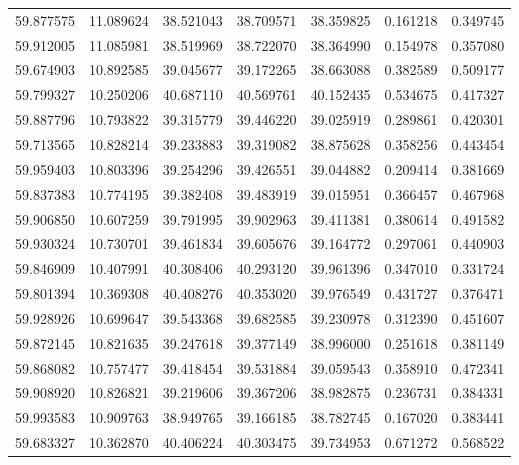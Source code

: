 \begin{tabular}{rrrrrrr}
 59.877575 &  11.089624 &         38.521043 &         38.709571 &         38.359825 &  0.161218 &  0.349745 \\
 59.912005 &  11.085981 &         38.519969 &         38.722070 &         38.364990 &  0.154978 &  0.357080 \\
 59.674903 &  10.892585 &         39.045677 &         39.172265 &         38.663088 &  0.382589 &  0.509177 \\
 59.799327 &  10.250206 &         40.687110 &         40.569761 &         40.152435 &  0.534675 &  0.417327 \\
 59.887796 &  10.793822 &         39.315779 &         39.446220 &         39.025919 &  0.289861 &  0.420301 \\
 59.713565 &  10.828214 &         39.233883 &         39.319082 &         38.875628 &  0.358256 &  0.443454 \\
 59.959403 &  10.803396 &         39.254296 &         39.426551 &         39.044882 &  0.209414 &  0.381669 \\
 59.837383 &  10.774195 &         39.382408 &         39.483919 &         39.015951 &  0.366457 &  0.467968 \\
 59.906850 &  10.607259 &         39.791995 &         39.902963 &         39.411381 &  0.380614 &  0.491582 \\
 59.930324 &  10.730701 &         39.461834 &         39.605676 &         39.164772 &  0.297061 &  0.440903 \\
 59.846909 &  10.407991 &         40.308406 &         40.293120 &         39.961396 &  0.347010 &  0.331724 \\
 59.801394 &  10.369308 &         40.408276 &         40.353020 &         39.976549 &  0.431727 &  0.376471 \\
 59.928926 &  10.699647 &         39.543368 &         39.682585 &         39.230978 &  0.312390 &  0.451607 \\
 59.872145 &  10.821635 &         39.247618 &         39.377149 &         38.996000 &  0.251618 &  0.381149 \\
 59.868082 &  10.757477 &         39.418454 &         39.531884 &         39.059543 &  0.358910 &  0.472341 \\
 59.908920 &  10.826821 &         39.219606 &         39.367206 &         38.982875 &  0.236731 &  0.384331 \\
 59.993583 &  10.909763 &         38.949765 &         39.166185 &         38.782745 &  0.167020 &  0.383441 \\
 59.683327 &  10.362870 &         40.406224 &         40.303475 &         39.734953 &  0.671272 &  0.568522 \\

\end{tabular}
